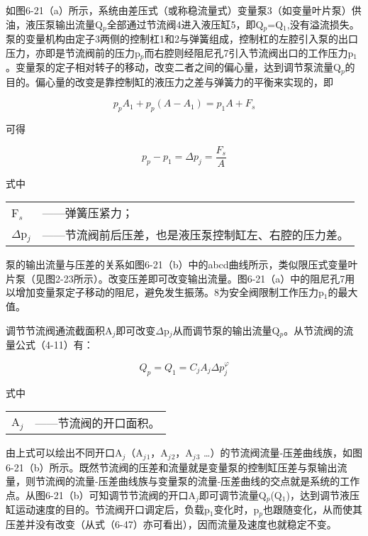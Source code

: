如图6-21（a）所示，系统由差压式（或称稳流量式）变量泵3（如变量叶片泵）供油，液压泵输出流量Q$_p$全部通过节流阀4进入液压缸5，即Q$_p$=Q$_1$,没有溢流损失。泵的变量机构由定子3两侧的控制杠1和2与弹簧组成，控制杠的左腔引入泵的出口压力，亦即是节流阀前的压力p$_p$而右腔则经阻尼孔7引入节流阀出口的工作压力p$_1$。变量泵的定子相对转子的移动，改变二者之间的偏心量，达到调节泵流量Q$_p$的目的。偏心量的改变是靠控制缸的液压力之差与弹簧力的平衡来实现的，即

\begin{equation}
  p_pA_1+p_p(A-A_1)=p_1A+F_s
\end{equation}

\noindent 可得

\begin{equation}
 p_p-p_1=\Delta p_j= \frac{F_s}{A}
\end{equation}

\noindent 式中\ 
\begin{tabular} [t]{ll}
F$_s$ &——\hspace{1mm}弹簧压紧力；\\
$\Delta$p$_j$ &——\hspace{1mm}节流阀前后压差，也是液压泵控制缸左、右腔的压力差。
\end{tabular}

泵的输出流量与压差的关系如图6-21（b）中的abcd曲线所示，类似限压式变量叶片泵（见图2-23所示）。改变压差即可改变输出流量。图6-21（a）中的阻尼孔7用以增加变量泵定子移动的阻尼，避免发生振荡。8为安全阀限制工作压力p$_1$的最大值。

调节节流阀通流截面积A$_j$即可改变$\Delta$p$_j$从而调节泵的输出流量Q$_p$。从节流阀的流量公式（4-11）有：

\begin{equation}
 Q_p=Q_1=C_jA_j \Delta p_j^\varphi
\end{equation}

\noindent 式中\ 
\begin{tabular} [t]{ll}
A$_j$ &——\hspace{1mm}节流阀的开口面积。
\end{tabular}

由上式可以绘出不同开口A$_j$（A$_j$$_1$，A$_j$$_2$，A$_j$$_3$ …）的节流阀流量-压差曲线族，如图6-21（b）所示。既然节流阀的压差和流量就是变量泵的控制缸压差与泵输出流量，则节流阀的流量-压差曲线族与变量泵的流量-压差曲线的交点就是系统的工作点。从图6-21（b）可知调节节流阀的开口A$_j$即可调节流量Q$_p$(Q$_1$)，达到调节液压缸运动速度的目的。节流阀开口调定后，负载p$_1$变化时，p$_p$也跟随变化，从而使其压差并没有改变（从式（6-47）亦可看出），因而流量及速度也就稳定不变。


